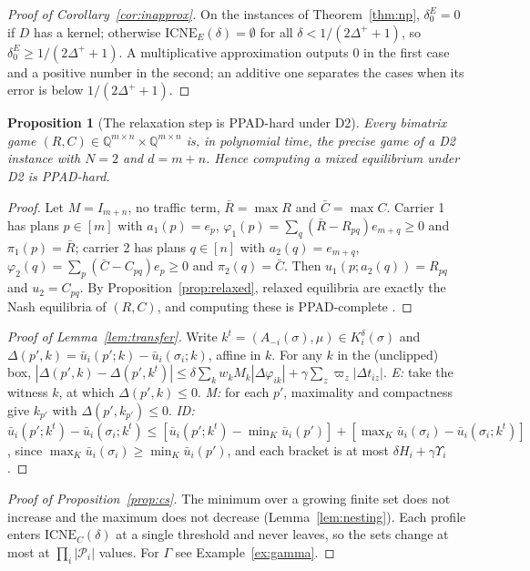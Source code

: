 \documentclass[preprint,11pt]{elsarticle}
\newtheorem{proposition}[theorem]{Proposition}
\theoremstyle{definition}
\theoremstyle{remark}
\newcommand{\cP}{\mathcal{P}}
\newcommand{\ub}{\bar u}
\newcommand{\ICNE}{\mathrm{ICNE}}
\begin{document}
\begin{proof}[Proof of Corollary~\ref{cor:inapprox}]
On the instances of Theorem~\ref{thm:np}, $\delta_0^E=0$ if $D$ has a kernel; otherwise $\ICNE_E(\delta)=\emptyset$ for all $\delta<1/(2\Delta^++1)$, so $\delta_0^E\ge1/(2\Delta^++1)$. A multiplicative approximation outputs $0$ in the first case and a positive number in the second; an additive one separates the cases when its error is below $1/(2\Delta^++1)$.
\end{proof}

\begin{proposition}[The relaxation step is PPAD-hard under D2]\label{prop:ppad}
Every bimatrix game $(R,C)\in\mathbb Q^{m\times n}\times\mathbb Q^{m\times n}$ is, in polynomial time, the precise game of a D2 instance with $N=2$ and $d=m+n$. Hence computing a mixed equilibrium under D2 is PPAD-hard.
\end{proposition}
\begin{proof}
Let $M=I_{m+n}$, no traffic term, $\bar R=\max R$ and $\bar C=\max C$. Carrier 1 has plans $p\in[m]$ with $a_1(p)=e_p$, $\varphi_1(p)=\sum_q(\bar R-R_{pq})e_{m+q}\ge0$ and $\pi_1(p)=\bar R$; carrier 2 has plans $q\in[n]$ with $a_2(q)=e_{m+q}$, $\varphi_2(q)=\sum_p(\bar C-C_{pq})e_p\ge0$ and $\pi_2(q)=\bar C$. Then $u_1(p;a_2(q))=R_{pq}$ and $u_2=C_{pq}$. By Proposition~\ref{prop:relaxed}, relaxed equilibria are exactly the Nash equilibria of $(R,C)$, and computing these is PPAD-complete \citep{Chen2009,Daskalakis2009}.
\end{proof}

\begin{proof}[Proof of Lemma~\ref{lem:transfer}]
Write $k^t=(A_{-i}(\sigma),\mu)\in K_i^\delta(\sigma)$ and $\Delta(p',k)=\ub_i(p';k)-\ub_i(\sigma_i;k)$, affine in $k$. For any $k$ in the (unclipped) box, $|\Delta(p',k)-\Delta(p',k^t)|\le\delta\sum_kw_kM_k|\Delta\varphi_{ik}|+\gamma\sum_z\varpi_z|\Delta t_{iz}|$. \emph{E:} take the witness $k$, at which $\Delta(p',k)\le0$. \emph{M:} for each $p'$, maximality and compactness give $k_{p'}$ with $\Delta(p',k_{p'})\le0$. \emph{ID:} $\ub_i(p';k^t)-\ub_i(\sigma_i;k^t)\le[\ub_i(p';k^t)-\min_K\ub_i(p')]+[\max_K\ub_i(\sigma_i)-\ub_i(\sigma_i;k^t)]$, since $\max_K\ub_i(\sigma_i)\ge\min_K\ub_i(p')$, and each bracket is at most $\delta H_i+\gamma\Upsilon_i$.
\end{proof}

\begin{proof}[Proof of Proposition~\ref{prop:cs}]
The minimum over a growing finite set does not increase and the maximum does not decrease (Lemma~\ref{lem:nesting}). Each profile enters $\ICNE_C(\delta)$ at a single threshold and never leaves, so the sets change at most at $\prod_i|\cP_i|$ values. For $\Gamma$ see Example~\ref{ex:gamma}.
\end{proof}
\end{document}
